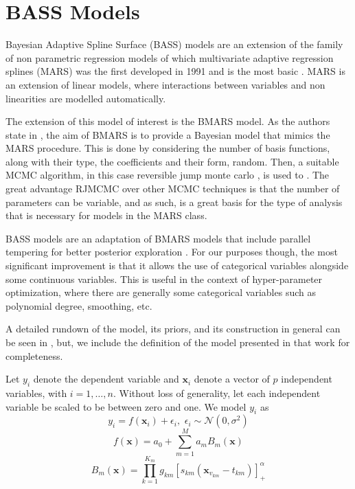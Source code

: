 \section{BASS Models}

Bayesian Adaptive Spline Surface (BASS) models are an extension of the family of non parametric regression models of which multivariate adaptive regression splines (MARS) was the first developed in 1991 and is the most basic \cite{friedman1991multivariate}. MARS is an extension of linear models, where interactions between variables and non linearities are modelled automatically. 

The extension of this model of interest is the BMARS model. As the authors state in \cite{denison1998bayesian}, the aim of BMARS is to provide a Bayesian model that mimics the MARS procedure. This is done by considering the number of basis functions, along with their type, the coefficients and their form, random. Then, a suitable MCMC algorithm, in this case reversible jump monte carlo \cite{green1995reversible}, is used to . The great advantage  RJMCMC over other MCMC techniques is that the number of parameters can be variable, and as such, is a great basis for the type of analysis that is necessary for models in the MARS class. 

BASS models are an adaptation of BMARS models that include  parallel tempering for better posterior exploration \cite{francom2020bass}. For our purposes though, the most significant improvement is that it allows the use of categorical variables alongside some continuous variables. This is useful in the context of hyper-parameter optimization, where there are generally some categorical variables such as polynomial degree, smoothing, etc.  

A detailed rundown of the model, its priors, and its construction in general can be seen in \cite{francom2020bass}, but, we include the definition of the model presented in that work for completeness. 

Let $y_i$ denote the dependent variable and $\boldsymbol{x}_i$ denote a vector of $p$ independent variables, with $i = 1, \ldots, n$. Without loss of generality, let each independent variable be scaled to be between
zero and one. We model $y_i$ as 
\begin{equation} y_i = f(\boldsymbol{x}_i) + \epsilon_i, \, \, \epsilon_i \sim \mathcal{N}(0,\sigma^2) \label{eq:bass_lik} \end{equation}
\begin{equation} f(\boldsymbol{x}) = a_0 + \sum_{m=1}^{M} a_m B_m(\boldsymbol{x}) \label{eq:bass_f} \end{equation}
\begin{equation} B_m(\boldsymbol{x}) = \prod_{k=1}^{K_m} g_{km} [s_{km}(\boldsymbol{x}_{v_{km}} - t_{km}) ]^\alpha_+ \label{eq:bass_basis} \end{equation}

